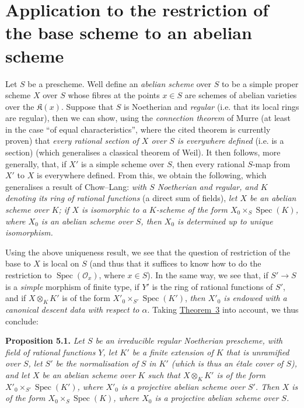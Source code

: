 \documentclass{article}
\newenvironment{itenv}[1]
  {\phantomsection\par\medskip\noindent\textbf{#1.}\itshape}
  {\par\medskip}
\newcommand{\scr}[1]{{\mathscr{#1}}}
\newcommand{\kres}{\mathfrak{K}}
\DeclareMathOperator{\Spec}{Spec}
\newcommand{\oldpage}[1]{\marginpar{\footnotesize$\Big\vert$ \textit{p.~#1}}}
\begin{document}
\section{Application to the restriction of the base scheme to an abelian scheme}
\label{B.5}

Let $S$ be a prescheme.
Well define an \emph{abelian scheme} over $S$ to be a simple proper scheme $X$
\oldpage{190-26}
over $S$ whose fibres at the points $x\in S$ are schemes of abelian varieties over the $\kres(x)$.
Suppose that $S$ is Noetherian and \emph{regular} (i.e. that its local rings are regular), then we can show, using the \emph{connection theorem} of Murre \cite{4} (at least in the case ``of equal characteristics'', where the cited theorem is currently proven) that \emph{every rational section of $X$ over $S$ is everywhere defined} (i.e. is a section) (which generalises a classical theorem of Weil).
It then follows, more generally, that, if $X'$ is a simple scheme over $S$, then every rational $S$-map from $X'$ to $X$ is everywhere defined.
From this, we obtain the following, which generalises a result of Chow--Lang:
\emph{with $S$ Noetherian and regular, and $K$ denoting its ring of rational functions} (a direct sum of fields), \emph{let $X$ be an abelian scheme over $K$; if $X$ is isomorphic to a $K$-scheme of the form $X_0\times_S\Spec(K)$, where $X_0$ is an abelian scheme over $S$, then $X_0$ is determined up to unique isomorphism.}

Using the above uniqueness result, we see that the question of restriction of the base to $X$ is local on $S$ (and thus that it suffices to know how to do the restriction to $\Spec(\scr{O}_x)$, where $x\in S$).
In the same way, we see that, if $S'\to S$ is a \emph{simple} morphism of finite type, if $Y'$ is the ring of rational functions of $S'$, and if $X\otimes_K K'$ is of the form $X'_0\times_{S'}\Spec(K')$, \emph{then $X'_0$ is endowed with a canonical descent data with respect to $\alpha$}.
Taking \hyperref[theorem:B.1(3)]{Theorem~3} into account, we thus conclude:

\begin{itenv}{Proposition 5.1}
  Let $S$ be an irreducible regular Noetherian prescheme, with field of rational functions $Y$, let $K'$ be a finite extension of $K$ that is \emph{unramified over $S$}, let $S'$ be the normalisation of $S$ in $K'$ (which is thus an \'{e}tale cover of $S$), and let $X$ be an abelian scheme over $K$ such that $X\otimes_K K'$ is of the form $X'_0\times_{S'}\Spec(K')$, where $X'_0$ is a projective abelian scheme over $S'$.
  Then $X$ is of the form $X_0\times_S\Spec(K)$, where $X_0$ is a projective abelian scheme over $S$.
\end{itenv}
\end{document}
